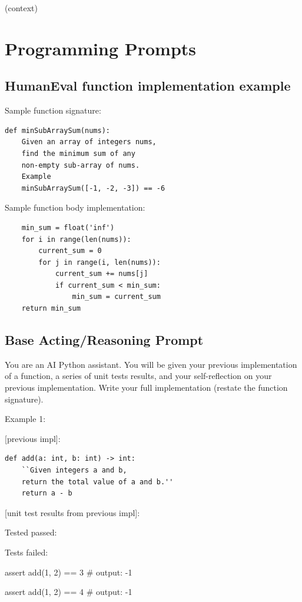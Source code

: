 {(context)

\section{Programming Prompts}
\label{sec:programming_prompt}
\subsection{HumanEval function implementation example}
Sample function signature:\\
\begin{lstlisting}
def minSubArraySum(nums):
    Given an array of integers nums, 
    find the minimum sum of any
    non-empty sub-array of nums.
    Example
    minSubArraySum([-1, -2, -3]) == -6
\end{lstlisting}

Sample function body implementation:\\
\begin{lstlisting}
    min_sum = float('inf')
    for i in range(len(nums)):
        current_sum = 0
        for j in range(i, len(nums)):
            current_sum += nums[j]
            if current_sum < min_sum:
                min_sum = current_sum
    return min_sum
\end{lstlisting}

\subsection{Base Acting/Reasoning Prompt}

You are an AI Python assistant. You will be given your previous implementation of a function, a series of unit tests results, and your self-reflection on your previous implementation. Write your full implementation (restate the function signature).

Example 1:

[previous impl]:

\begin{lstlisting}
def add(a: int, b: int) -> int:
    ``Given integers a and b, 
    return the total value of a and b.''
    return a - b
\end{lstlisting}

[unit test results from previous impl]:

Tested passed:

Tests failed:

assert add(1, 2) == 3 \# output: -1

assert add(1, 2) == 4 \# output: -1

}
